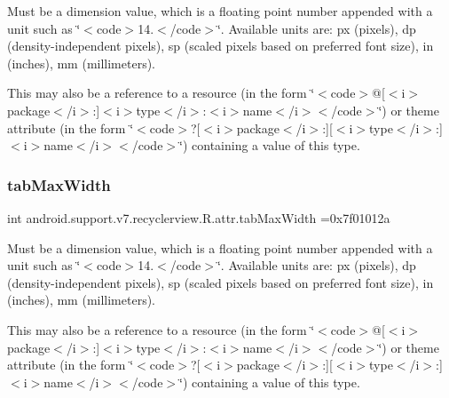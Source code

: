Must be a dimension value, which is a floating point number appended with a unit such as \char`\"{}$<$code$>$14.\+5sp$<$/code$>$\char`\"{}. Available units are\+: px (pixels), dp (density-\/independent pixels), sp (scaled pixels based on preferred font size), in (inches), mm (millimeters). 

This may also be a reference to a resource (in the form \char`\"{}$<$code$>$@\mbox{[}$<$i$>$package$<$/i$>$\+:\mbox{]}$<$i$>$type$<$/i$>$\+:$<$i$>$name$<$/i$>$$<$/code$>$\char`\"{}) or theme attribute (in the form \char`\"{}$<$code$>$?\mbox{[}$<$i$>$package$<$/i$>$\+:\mbox{]}\mbox{[}$<$i$>$type$<$/i$>$\+:\mbox{]}$<$i$>$name$<$/i$>$$<$/code$>$\char`\"{}) containing a value of this type. \mbox{\label{classandroid_1_1support_1_1v7_1_1recyclerview_1_1R_1_1attr_a4b3dc8eb7824a500cfff33e6ce9f920c}} 
\subsubsection{\texorpdfstring{tab\+Max\+Width}{tabMaxWidth}}
{\footnotesize\ttfamily int android.\+support.\+v7.\+recyclerview.\+R.\+attr.\+tab\+Max\+Width =0x7f01012a\hspace{0.3cm}{\ttfamily [static]}}

Must be a dimension value, which is a floating point number appended with a unit such as \char`\"{}$<$code$>$14.\+5sp$<$/code$>$\char`\"{}. Available units are\+: px (pixels), dp (density-\/independent pixels), sp (scaled pixels based on preferred font size), in (inches), mm (millimeters). 

This may also be a reference to a resource (in the form \char`\"{}$<$code$>$@\mbox{[}$<$i$>$package$<$/i$>$\+:\mbox{]}$<$i$>$type$<$/i$>$\+:$<$i$>$name$<$/i$>$$<$/code$>$\char`\"{}) or theme attribute (in the form \char`\"{}$<$code$>$?\mbox{[}$<$i$>$package$<$/i$>$\+:\mbox{]}\mbox{[}$<$i$>$type$<$/i$>$\+:\mbox{]}$<$i$>$name$<$/i$>$$<$/code$>$\char`\"{}) containing a value of this type. \mbox{\label{classandroid_1_1support_1_1v7_1_1recyclerview_1_1R_1_1attr_aa3533d8314e51e3bb05c9486d3d1b14a}} 
